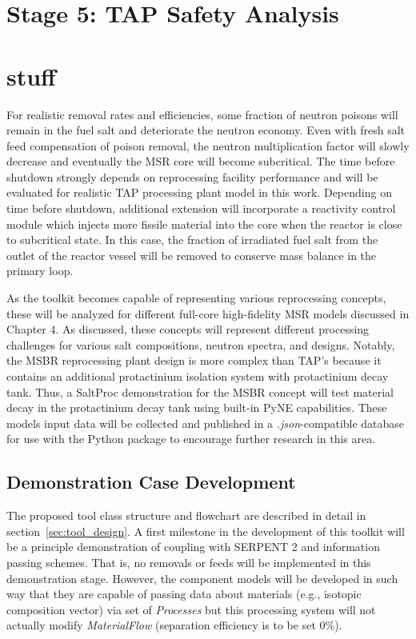 \section{Stage 5: \gls{TAP} Safety Analysis}

\section{stuff}
For realistic removal rates and efficiencies, some fraction of neutron poisons 
will remain in the fuel salt and deteriorate the neutron economy. Even with 
fresh salt feed compensation of poison removal, the neutron multiplication 
factor will slowly decrease and eventually the \gls{MSR} core will become 
subcritical. The time before 
shutdown strongly depends on reprocessing facility performance 
and will be evaluated for realistic \gls{TAP} processing plant model 
in this work. Depending on time before shutdown, additional 
extension will 
incorporate a reactivity control module which injects more fissile 
material into the core when the reactor is close to subcritical state. 
In this case, the fraction of irradiated fuel salt from the outlet of 
the reactor vessel will be removed to conserve mass balance in the 
primary loop.

As the toolkit becomes capable of representing various reprocessing 
concepts, these will be analyzed for different full-core 
high-fidelity \gls{MSR} models discussed in Chapter 4. As discussed, 
these concepts will represent different processing challenges 
for various salt compositions, neutron spectra, and designs. 
Notably, the \gls{MSBR} reprocessing plant design is more complex 
than \gls{TAP}'s because it contains an additional protactinium 
isolation system with protactinium decay tank. Thus, a SaltProc 
demonstration for the \gls{MSBR} concept will test material decay 
in the protactinium decay tank using built-in PyNE capabilities. 
These models input data will be collected and 
published in a \textit{.json}-compatible database for use with the 
Python package to encourage further research in this area.



\subsection{Demonstration Case Development}
The proposed tool class structure and flowchart are 
described in detail in section~\ref{sec:tool_design}.
A first milestone in the development of this toolkit will be a 
principle demonstration of coupling with SERPENT 2 and 
information passing schemes. That is, no removals or feeds 
will be implemented in this demonstration stage. However, 
the component models will be developed in such way that 
they are capable of passing data about materials (e.g., isotopic 
composition vector) via set of \textit{Processes} but this 
processing system will not actually modify \textit{MaterialFlow} 
(separation efficiency is to be set 0\%).

